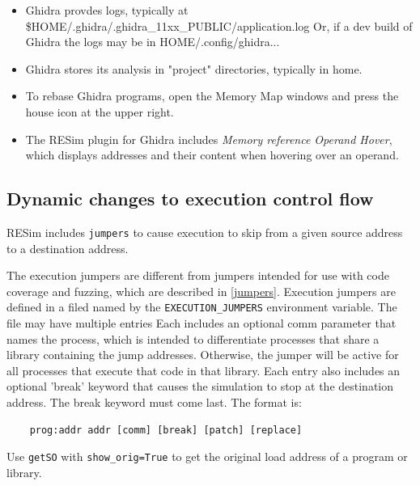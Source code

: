 \documentclass[titlepage]{article}
\begin{document}
\begin{itemize}
\item Ghidra provdes logs, typically at \$HOME/.ghidra/.ghidra\_11xx\_PUBLIC/application.log
Or, if a dev build of Ghidra the logs may be in HOME/.config/ghidra...

\item Ghidra stores its analysis in "project" directories, typically in home.

\item To rebase Ghidra programs, open the Memory Map windows and press the house icon at the upper right.

\item The RESim plugin for Ghidra includes \textit{Memory reference Operand Hover}, which displays addresses
and their content when hovering over an operand.


\end{itemize}

\subsection{Dynamic changes to execution control flow}
\label{dynamic_control_flow}
RESim includes {\tt jumpers} to cause execution to skip from a given source address to a destination address.

The execution jumpers are different from jumpers intended for use with code coverage and fuzzing,
which are described in \ref{jumpers}.
Execution jumpers are defined in a filed named by the {\tt EXECUTION\_JUMPERS} environment variable.
The file may have multiple entries
Each includes an optional comm parameter that names the process,
which is intended to differentiate processes that share a library containing the jump 
addresses. Otherwise, the jumper will be active for all processes that execute that code
in that library. Each entry also includes an optional 'break' keyword that causes the
simulation to stop at the destination address. The break keyword must come last.
The format is:

\begin{verbatim}
    prog:addr addr [comm] [break] [patch] [replace]
\end{verbatim}
Use {\tt getSO} with {\tt show\_orig=True} to get the original load address of a program or library.
\end{document}
